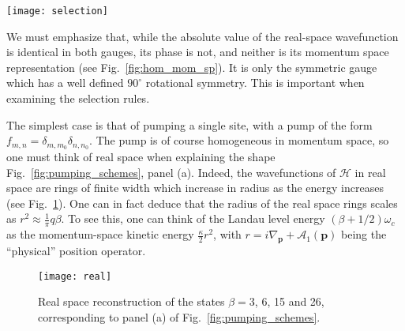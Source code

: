 \documentclass[twocolumn, 10pt, aps, superscriptaddress, floatfix, showpacs, pra, citeautoscript]{revtex4-1}
\newcommand{\co}[2]{#2}
\renewcommand{\paragraph}{\co}
\begin{document}
\begin{figure*}[htb]\centering
  \texttt{[image: selection]} %
  \caption{Intensity spectra for different pumping conditions: (a)
    pumping the single site (5,5), (b) pumping with a Gaussian
    profile, (c) homogeneous pumping and (d) pumping with a random
    phase. Black curves correspond to using the Landau gauge while
    green (dashed) ones to the symmetric gauge. The dotted vertical
    lines (with labels indicating the value of $\beta$) mark the
    states which were selected for later analysis. The spectra in
    panels (a) and (d) are identical for both gauges.}
  \label{fig:pumping_schemes}
\end{figure*}

We must emphasize that, while the absolute value of the real-space
wavefunction is identical in both gauges, its phase is not, and
neither is its momentum space representation (see
Fig.~\ref{fig:hom_mom_sp}). It is only the symmetric gauge which has a
well defined $90^{\circ}$ rotational symmetry. This is important when
examining the selection rules.

\paragraph{A δ pump in real space is homogeneous in momentum space.}
The simplest case is that of pumping a single site, with a pump of the
form $f_{m,n} = \delta_{m,m_0} \delta_{n,n_0}$. The pump is of course
homogeneous in momentum space, so one must think of real space when
explaining the shape Fig.~\ref{fig:pumping_schemes}, panel (a).
Indeed, the wavefunctions of $\mathcal{H}$ in real space are rings of finite
width which increase in radius as the energy increases (see
Fig.~\ref{fig:delta_real_sp}). One can in fact deduce that the radius
of the real space rings scales as $r^2 \approx \frac{1}{\pi} q
\beta$.
To see this, one can think of the Landau level energy
$(\beta + 1/2)\omega_c$ as the momentum-space kinetic energy
$\frac{\kappa}{2}r^2$, with
$r = i\nabla_{\mathbf{p}} + \mathcal{A}_1(\mathbf{p})$ being the
``physical'' position operator.
\begin{figure}[htb]
  \centering
  \texttt{[image: real]} %
  \caption{Real space reconstruction of the states $\beta=3$, 6, 15
    and 26, corresponding to panel (a) of
    Fig.~\ref{fig:pumping_schemes}.}
  \label{fig:delta_real_sp}
\end{figure}
\end{document}

